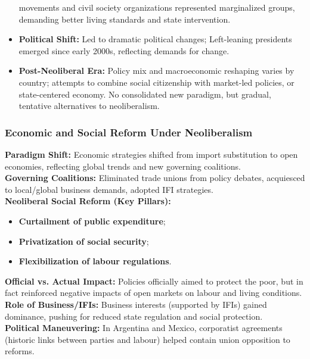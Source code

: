 \documentclass{article}
\begin{document}
\begin{itemize}
        movements and civil society organizations represented marginalized
        groups, demanding better living standards and state intervention.
        \item \textbf{Political Shift:} Led to dramatic political changes;
        Left-leaning presidents emerged since early 2000s, reflecting
        demands for change.
        \item \textbf{Post-Neoliberal Era:} Policy mix and macroeconomic
        reshaping varies by country; attempts to combine social citizenship
        with market-led policies, or state-centered economy. No consolidated
        new paradigm, but gradual, tentative alternatives to neoliberalism.
    \end{itemize}

    \subsubsection{Economic and Social Reform Under Neoliberalism}

    \noindent \textbf{Paradigm Shift:} Economic strategies shifted from
import substitution to open economies, reflecting global trends and new
governing coalitions.\\

    \noindent \textbf{Governing Coalitions:} Eliminated trade unions from
policy debates, acquiesced to local/global business demands, adopted IFI
strategies.\\

    \noindent \textbf{Neoliberal Social Reform (Key Pillars):}
    \begin{itemize}
        \item \textbf{Curtailment of public expenditure};
        \item \textbf{Privatization of social security};
        \item \textbf{Flexibilization of labour regulations}.
    \end{itemize}

    \noindent \textbf{Official vs. Actual Impact:} Policies officially aimed
to protect the poor, but in fact reinforced negative impacts of open markets
on labour and living conditions.\\

    \noindent \textbf{Role of Business/IFIs:} Business interests (supported
by IFIs) gained dominance, pushing for reduced state regulation and social
protection.\\

    \noindent \textbf{Political Maneuvering:} In Argentina and Mexico,
corporatist agreements (historic links between parties and labour) helped
contain union opposition to reforms.\\
\end{document}
